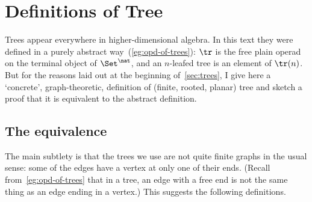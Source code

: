 
\chapter{Definitions of Tree}
%
%
%
%
%



\noindent
Trees appear everywhere in higher-dimensional algebra.  In this text they
were defined in a purely abstract way~(\ref{eg:opd-of-trees}): $\tr$ is the
free plain operad on the terminal object of $\Set^\nat$, and an $n$-leafed
tree is an element of $\tr(n)$.  But for the reasons laid out at the
beginning of~\ref{sec:trees}, I give here a `concrete', graph-theoretic,
definition of (finite, rooted, planar) tree and sketch a proof that it is
equivalent to the abstract definition.

\section{The equivalence}

The main subtlety is that the trees we use are not quite finite graphs in
the usual sense: some of the edges have a vertex at only one of their ends.
(Recall from~\ref{eg:opd-of-trees} that in a tree, an edge with a free end
is not the same thing as an edge ending in a vertex.)  This suggests the
following definitions.

